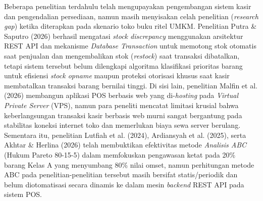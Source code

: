 \documentclass[11pt, a4paper]{article}
\begin{document}
Beberapa penelitian terdahulu telah mengupayakan pengembangan sistem kasir dan pengendalian persediaan, namun masih menyisakan celah penelitian (\textit{research gap}) ketika diterapkan pada skenario toko buku ritel UMKM. Penelitian Putra \& Saputro (2026) berhasil mengatasi \textit{stock discrepancy} menggunakan arsitektur REST API dan mekanisme \textit{Database Transaction} untuk memotong stok otomatis saat penjualan dan mengembalikan stok (\textit{restock}) saat transaksi dibatalkan, tetapi sistem tersebut belum dilengkapi algoritma klasifikasi prioritas barang untuk efisiensi \textit{stock opname} maupun proteksi otorisasi khusus saat kasir membatalkan transaksi barang bernilai tinggi. Di sisi lain, penelitian Malfin et al. (2026) membangun aplikasi POS berbasis web yang di-\textit{hosting} pada \textit{Virtual Private Server} (VPS), namun para peneliti mencatat limitasi krusial bahwa keberlangsungan transaksi kasir berbasis web murni sangat bergantung pada stabilitas koneksi internet toko dan memerlukan biaya sewa server berulang. Sementara itu, penelitian Lutfiah et al. (2024), Ardiansyah et al. (2025), serta Akhtar \& Herlina (2026) telah membuktikan efektivitas metode \textit{Analisis ABC} (Hukum Pareto 80-15-5) dalam memfokuskan pengawasan ketat pada 20\% barang Kelas A yang menyumbang 80\% nilai omset, namun perhitungan metode ABC pada penelitian-penelitian tersebut masih bersifat statis/periodik dan belum diotomatisasi secara dinamis ke dalam mesin \textit{backend} REST API pada sistem POS.
\end{document}
